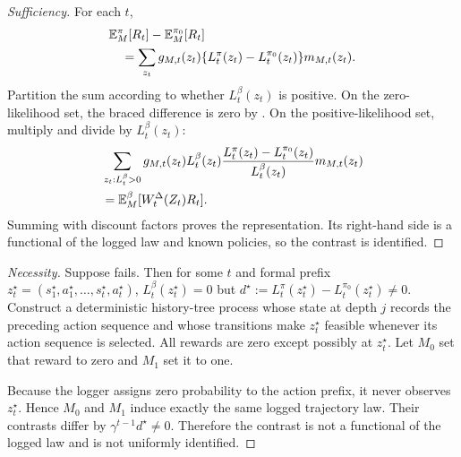 \begin{proof}[Sufficiency]
For each $t$,
\begin{align*}
&\mathbb{E}_M^\pi[R_t]-\mathbb{E}_M^{\pi_0}[R_t]\\
&\quad=\sum_{z_t}g_{M,t}(z_t)
\{L_t^\pi(z_t)-L_t^{\pi_0}(z_t)\}m_{M,t}(z_t).
\end{align*}
Partition the sum according to whether $L_t^\beta(z_t)$ is positive. On the zero-likelihood set, the braced difference is zero by \UCC. On the positive-likelihood set, multiply and divide by $L_t^\beta(z_t)$:
\begin{align*}
&\sum_{z_t:L_t^\beta>0}g_{M,t}(z_t)L_t^\beta(z_t)
\frac{L_t^\pi(z_t)-L_t^{\pi_0}(z_t)}{L_t^\beta(z_t)}m_{M,t}(z_t)\\
&=\mathbb{E}_M^\beta[W_t^\Delta(Z_t)R_t].
\end{align*}
Summing with discount factors proves the representation. Its right-hand side is a functional of the logged law and known policies, so the contrast is identified.
\end{proof}

\begin{proof}[Necessity]
Suppose \UCC fails. Then for some $t$ and formal prefix
$z_t^\star=(s_1^\star,a_1^\star,\ldots,s_t^\star,a_t^\star)$,
$L_t^\beta(z_t^\star)=0$ but
$d^\star:=L_t^\pi(z_t^\star)-L_t^{\pi_0}(z_t^\star)\ne0$.
Construct a deterministic history-tree process whose state at depth $j$ records the preceding action sequence and whose transitions make $z_t^\star$ feasible whenever its action sequence is selected. All rewards are zero except possibly at $z_t^\star$. Let $M_0$ set that reward to zero and $M_1$ set it to one.

Because the logger assigns zero probability to the action prefix, it never observes $z_t^\star$. Hence $M_0$ and $M_1$ induce exactly the same logged trajectory law. Their contrasts differ by
$\gamma^{t-1}d^\star\ne0$. Therefore the contrast is not a functional of the logged law and is not uniformly identified.
\end{proof}
